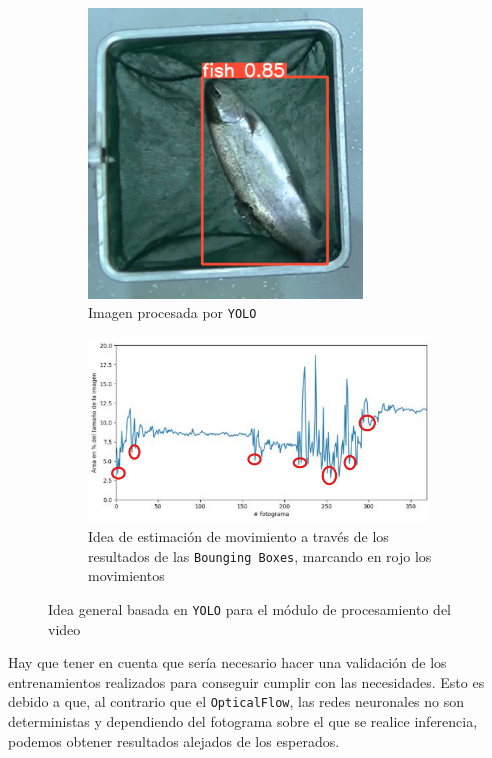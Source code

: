 \begin{enumerate}
    \begin{figure}[H]
        \centering
        \begin{subfigure}[t]{0.39\textwidth}
            \centering
            \includegraphics[width=0.8\textwidth]{images/6/EjemploYOLO.png}
            \caption{Imagen procesada por \texttt{YOLO}}
        \end{subfigure}
        \begin{subfigure}[t]{0.59\textwidth}
            \centering
            \includegraphics[width=0.99\textwidth]{images/6/YOLOEjemploResultados.png}
            \caption{Idea de estimación de movimiento a través de los resultados de las \texttt{Bounging Boxes}, marcando en rojo los movimientos}
        \end{subfigure}
        \caption{Idea general basada en \texttt{YOLO} para el módulo de procesamiento del video}
        \label{fig:IdeaYOLOGeneral}
    \end{figure}

    Hay que tener en cuenta que sería necesario hacer una validación de los entrenamientos realizados para conseguir cumplir con las necesidades. 
    Esto es debido a que, al contrario que el \texttt{OpticalFlow}, las redes neuronales no son deterministas y dependiendo del fotograma sobre el que se realice inferencia, 
    podemos obtener resultados alejados de los esperados.
\end{enumerate}

